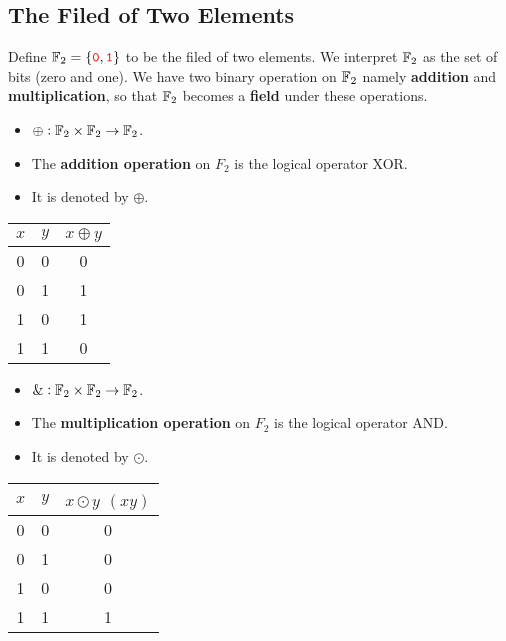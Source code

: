 \subsection{The Filed of Two Elements}
Define $\mathbb{F}_2=\set{\textcolor{red}{\texttt{0}},\textcolor{red}{\texttt{1}}}$ to be the filed of two elements. We interpret $\mathbb{F}_2$ as the set of bits (zero and one). We have two binary operation on $\mathbb{F}_2$ namely \textbf{addition} and \textbf{multiplication}, so that $\mathbb{F}_2$ becomes a \textbf{field} under these operations.
\begin{center}
\begin{minipage}{.48\textwidth}
\begin{itemize}
	\item $\oplus:\mathbb{F}_2\times\mathbb{F}_2\to\mathbb{F}_2$.
	\item The \textbf{addition operation} on $F_2$ is the logical operator XOR.
	\item It is denoted by $\oplus$.
\end{itemize}
\begin{center}
\begin{tabular}{c|c||c}
	\toprule[1.2pt]
	$x$ & $y$ & $x\oplus y$\\
	\hline
	0 & 0 & 0\\
	\hline
	0 & 1 & 1\\
	\hline
	1 & 0 & 1\\
	\hline
	1 & 1 & 0\\
	\bottomrule[1.2pt]
\end{tabular}
\end{center}
\end{minipage}
\begin{minipage}{.48\textwidth}
\begin{itemize}
	\item $\&:\mathbb{F}_2\times\mathbb{F}_2\to\mathbb{F}_2$.
	\item The \textbf{multiplication operation} on $F_2$ is the logical operator AND.
	\item It is denoted by $\odot$.
\end{itemize}
\begin{center}
	\begin{tabular}{c|c||c}
		\toprule[1.2pt]
		$x$ & $y$ & $x\odot y$ $(xy)$\\
		\hline
		0 & 0 & 0\\
		\hline
		0 & 1 & 0\\
		\hline
		1 & 0 & 0\\
		\hline
		1 & 1 & 1\\
		\bottomrule[1.2pt]
	\end{tabular}
\end{center}
\end{minipage}
\end{center}

